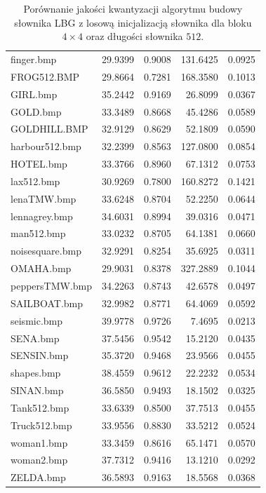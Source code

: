 \documentclass{article}
\begin{document}
\begin{table}[h]
\begin{tabular}{@{}lrrrr@{}}
finger.bmp         & 29.9399       & 0.9008 & 131.6425 & 0.0925 \\
FROG512.BMP        & 29.8664       & 0.7281 & 168.3580 & 0.1013 \\
GIRL.bmp           & 35.2442       & 0.9169 & 26.8099  & 0.0367 \\
GOLD.bmp           & 33.3489       & 0.8668 & 45.4286  & 0.0589 \\
GOLDHILL.BMP       & 32.9129       & 0.8629 & 52.1809  & 0.0590 \\
harbour512.bmp     & 32.2399       & 0.8563 & 127.0800 & 0.0854 \\
HOTEL.bmp          & 33.3766       & 0.8960 & 67.1312  & 0.0753 \\
lax512.bmp         & 30.9269       & 0.7800 & 160.8272 & 0.1421 \\
lenaTMW.bmp        & 33.6248       & 0.8704 & 52.2250  & 0.0644 \\
lennagrey.bmp      & 34.6031       & 0.8994 & 39.0316  & 0.0471 \\
man512.bmp         & 33.0232       & 0.8705 & 64.1381  & 0.0660 \\
noisesquare.bmp    & 32.9291       & 0.8254 & 35.6925  & 0.0311 \\
OMAHA.bmp          & 29.9031       & 0.8378 & 327.2889 & 0.1044 \\
peppersTMW.bmp     & 34.2263       & 0.8743 & 42.6578  & 0.0497 \\
SAILBOAT.bmp       & 32.9982       & 0.8771 & 64.4069  & 0.0592 \\
seismic.bmp        & 39.9778       & 0.9726 & 7.4695   & 0.0213 \\
SENA.bmp           & 37.5456       & 0.9542 & 15.2120  & 0.0435 \\
SENSIN.bmp         & 35.3720       & 0.9468 & 23.9566  & 0.0455 \\
shapes.bmp         & 38.4559       & 0.9612 & 22.2232  & 0.0534 \\
SINAN.bmp          & 36.5850       & 0.9493 & 18.1502  & 0.0325 \\
Tank512.bmp        & 33.6339       & 0.8500 & 37.7513  & 0.0455 \\
Truck512.bmp       & 33.9556       & 0.8830 & 33.5212  & 0.0524 \\
woman1.bmp         & 33.3459       & 0.8616 & 65.1471  & 0.0570 \\
woman2.bmp         & 37.7312       & 0.9416 & 13.1210  & 0.0292 \\
ZELDA.bmp          & 36.5893       & 0.9163 & 18.5568  & 0.0368 \\ \bottomrule
\end{tabular}
\caption{Porównanie jakości kwantyzacji algorytmu budowy słownika LBG z losową inicjalizacją słownika dla bloku $4 \times 4$ oraz długości słownika $512$.}
\label{tab:lbg_random}
\end{table}
\end{document}

